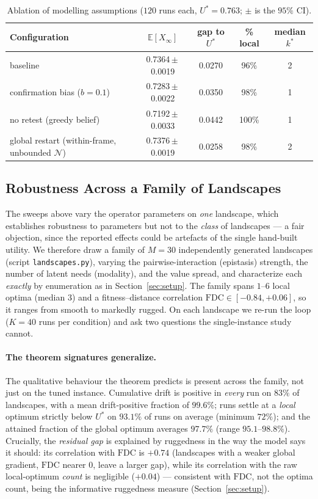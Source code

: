 \documentclass[11pt]{article}
\newcommand{\E}{\mathbb{E}}
\begin{document}
\begin{table}[h!]
\centering
\caption{Ablation of modelling assumptions ($120$ runs each, $U^*=0.763$; $\pm$ is the $95\%$ CI).}
\label{tab:abl}
\footnotesize
\begin{tabular}{@{}lcccc@{}}
\toprule
\textbf{Configuration} & $\E[X_\infty]$ & gap to $U^*$ & \% local & median $k^*$ \\
\midrule
baseline & 0.7364\,$\pm$\,0.0019 & 0.0270 & 96\% & 2 \\
confirmation bias ($b{=}0.1$) & 0.7283\,$\pm$\,0.0022 & 0.0350 & 98\% & 1 \\
no retest (greedy belief) & 0.7192\,$\pm$\,0.0033 & 0.0442 & 100\% & 1 \\
global restart (within-frame, unbounded $\mathcal{N}$) & 0.7376\,$\pm$\,0.0019 & 0.0258 & 98\% & 2 \\
\bottomrule
\end{tabular}
\end{table}

\subsection{Robustness Across a Family of Landscapes}
\label{sec:landscapes}

The sweeps above vary the operator parameters on \emph{one} landscape, which establishes robustness to parameters but not to the \emph{class} of landscapes --- a fair objection, since the reported effects could be artefacts of the single hand-built utility. We therefore draw a family of $M=30$ independently generated landscapes (script \texttt{landscapes.py}), varying the pairwise-interaction (epistasis) strength, the number of latent needs (modality), and the value spread, and characterize each \emph{exactly} by enumeration as in Section~\ref{sec:setup}. The family spans $1$--$6$ local optima (median $3$) and a fitness--distance correlation $\mathrm{FDC}\in[-0.84,+0.06]$, so it ranges from smooth to markedly rugged. On each landscape we re-run the loop ($K=40$ runs per condition) and ask two questions the single-instance study cannot.

\paragraph{The theorem signatures generalize.} The qualitative behaviour the theorem predicts is present across the family, not just on the tuned instance. Cumulative drift is positive in \emph{every} run on $83\%$ of landscapes, with a mean drift-positive fraction of $99.6\%$; runs settle at a \emph{local} optimum strictly below $U^*$ on $93.1\%$ of runs on average (minimum $72\%$); and the attained fraction of the global optimum averages $97.7\%$ (range $95.1$--$98.8\%$). Crucially, the \emph{residual gap} is explained by ruggedness in the way the model says it should: its correlation with $\mathrm{FDC}$ is $+0.74$ (landscapes with a weaker global gradient, $\mathrm{FDC}$ nearer $0$, leave a larger gap), while its correlation with the raw local-optimum \emph{count} is negligible ($+0.04$) --- consistent with $\mathrm{FDC}$, not the optima count, being the informative ruggedness measure (Section~\ref{sec:setup}).
\end{document}
